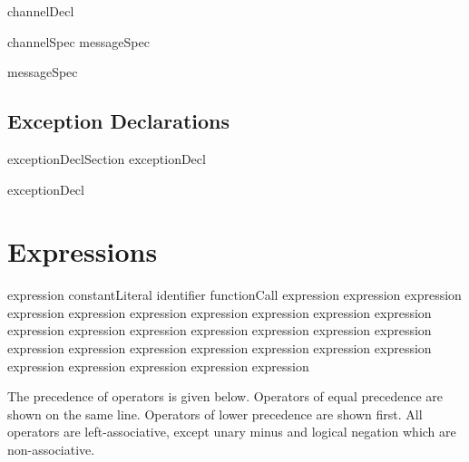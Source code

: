 \bgrm
channelDecl \Derive
   
\egrm

\bgrm
channelSpec \Derive
  \trm{:} \trm{(} messageSpec  \trm{)}
\egrm

\bgrm
messageSpec \Derive
   
\egrm

\subsection{Exception Declarations}
\bgrm
exceptionDeclSection \Derive
   exceptionDecl 
\egrm

\bgrm
exceptionDecl \Derive
   \trm{:} 
\egrm

\section{Expressions}

\bgrm
expression \Derive
     constantLiteral               
\alt identifier                    
\alt {}                                
\alt functionCall               
\alt \trm{-} expression                                 
\alt expression \trm{*} expression                                
\alt expression \trm{/} expression                               
\alt expression \trm{+} expression         
\alt expression \trm{-} expression                                
\alt expression  expression      
\alt expression \trm{=} expression                          
\alt expression \trm{/=} expression                               
\alt expression \trm{<} expression                                
\alt expression \trm{<=} expression                                
\alt expression \trm{>} expression                              
\alt expression \trm{>=} expression                               
\alt {} expression               
\alt expression  expression      
\alt expression  expression       
\alt \trm{(} expression \trm{)}
\egrm

The precedence of operators is given below. Operators of equal
precedence are shown on the same line. Operators of lower precedence
are shown first. All operators are left-associative, except unary minus
and logical negation which are non-associative.

\bgrm
\quad{}
\alt {}
\alt {}
\alt \trm{=} \quad \trm{/=} \quad \trm{<} \quad \trm{<=} \quad \trm{>=} \quad \trm{>}
\alt \trm{+} \quad \trm{-}
\alt \trm{*} \quad \trm{/} \quad {}
\egrm

